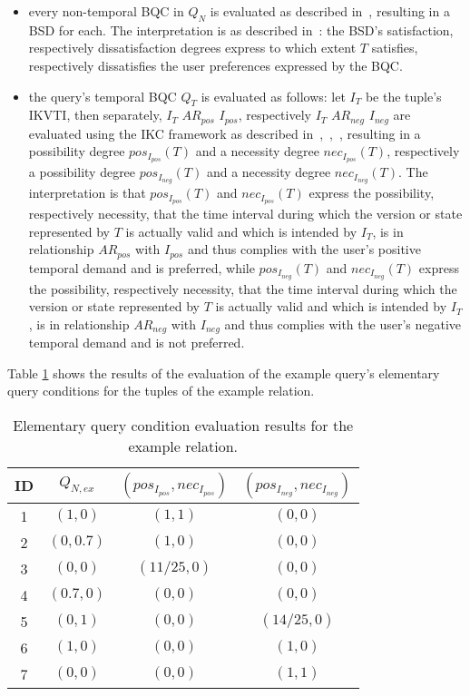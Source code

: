 \documentclass[runningheads,a4paper]{llncs}
\begin{document}
\begin{itemize}
\item every non-temporal BQC in $Q_N$ is evaluated as described in~\cite{Matthe2011ijis}, resulting in a BSD for each. The interpretation is as described in~\cite{Matthe2011ijis}: the BSD's satisfaction, respectively dissatisfaction degrees express to which extent $T$ satisfies, respectively dissatisfies the user preferences expressed by the BQC.
\item the query's temporal BQC $Q_T$ is evaluated as follows: let $I_T$ be the tuple's IKVTI, then separately, $I_T$ $AR_{pos}$ $I_{pos}$, respectively $I_T$ $AR_{neg}$ $I_{neg}$ are evaluated using the IKC framework as described in~\cite{Pons2013ijufkbs},~\cite{Pons2012ijcis},~\cite{Pons2012ipmu}, resulting in a possibility degree $pos_{I_{pos}}(T)$ and a necessity degree $nec_{I_{pos}}(T)$, respectively a possibility degree $pos_{I_{neg}}(T)$ and a necessity degree $nec_{I_{neg}}(T)$. The interpretation is that $pos_{I_{pos}}(T)$ and $nec_{I_{pos}}(T)$ express the possibility, respectively necessity, that the time interval during which the version or state represented by $T$ is actually valid and which is intended by $I_T$, is in relationship $AR_{pos}$ with $I_{pos}$ and thus complies with the user's positive temporal demand and is preferred, while $pos_{I_{neg}}(T)$ and $nec_{I_{neg}}(T)$ express the possibility, respectively necessity, that the time interval during which the version or state represented by $T$ is actually valid and which is intended by $I_T$, is in relationship $AR_{neg}$ with $I_{neg}$ and thus complies with the user's negative temporal demand and is not preferred.
\end{itemize}

Table \ref{tab:ex-evaluation} shows the results of the evaluation of the example query's elementary query conditions for the tuples of the example relation.
\vspace{-10pt}
\begin{table}[ht]
\caption{Elementary query condition evaluation results for the example relation.}
\centering
\begin{tabular}{|c|c|c|c|}
\hline
\textbf{ID} & \textbf{$Q_{N,ex}$} & \textbf{$(pos_{I_{pos}}, nec_{I_{pos}})$} & \textbf{$(pos_{I_{neg}}, nec_{I_{neg}})$} \\
\hline
\hline
1 & $(1, 0)$ & $(1,1)$ & $(0,0)$ \\
\hline
2 & $(0, 0.7)$ & $(1,0)$ & $(0,0)$ \\
\hline
3 & $(0, 0)$ & $(11/25,0)$ & $(0,0)$ \\
\hline
4 & $(0.7, 0)$ & $(0,0)$ & $(0,0)$ \\
\hline
5 & $(0, 1)$ & $(0,0)$ & $(14/25,0)$ \\
\hline
6 & $(1, 0)$ & $(0,0)$ & $(1,0)$ \\
\hline
7 & $(0, 0)$ & $(0,0)$ & $(1,1)$ \\
\hline
\end{tabular}
\label{tab:ex-evaluation}
\end{table}
\vspace{-30pt}
\end{document}
